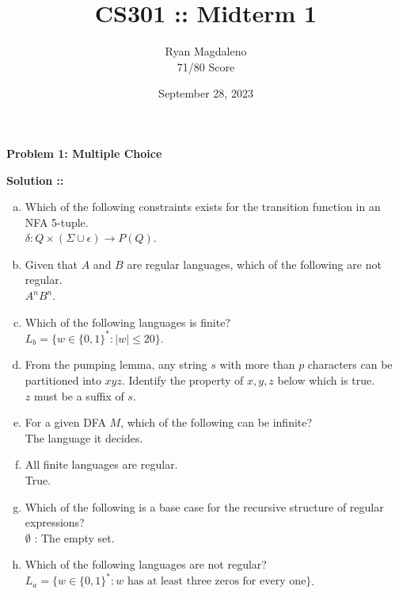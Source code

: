 \documentclass[11pt]{article}
\date{September 28, 2023}
\title{CS301 :: Midterm 1}
\author{Ryan Magdaleno\\71/80 Score}
\begin{document}
\maketitle


\textbf{Problem 1: Multiple Choice}

\vspace{5px}\textbf{Solution ::} 
\begin{enumerate}[a)]
\item Which of the following constraints exists for the transition function in an NFA
5-tuple. \\
$\delta : Q\times (\Sigma\cup\epsilon)\longrightarrow P(Q)$.
\item Given that $A$ and $B$ are regular languages, which of the following are
not regular. \\ $A^nB^n$.
\item Which of the following languages is finite? \\
$L_b = \{w\in\{0,1\}^* : |w|\le 20\}$.
\item From the pumping lemma, any string $s$ with more than $p$ characters can
be partitioned into $xyz$. Identify the property of $x,y,z$ below which is true. \\
$z$ must be a suffix of $s$.
\item For a given DFA $M$, which of the following can be infinite? \\
The language it decides.
\item All finite languages are regular. \\ True.
\item Which of the following is a base case for the recursive structure of regular
expressions? \\ $\emptyset$ : The empty set.
\item Which of the following languages are not regular? \\
$L_a = \{w\in\{0,1\}^* : w\text{ has at least three zeros for every one}\}$.
\end{enumerate}
\pagebreak

\end{document}

